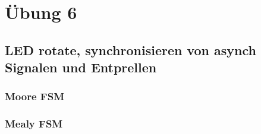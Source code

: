\section{Übung 6}
\subsection{LED rotate, synchronisieren von asynch Signalen und Entprellen}
\subsubsection{Moore FSM}

\subsubsection{Mealy FSM}
